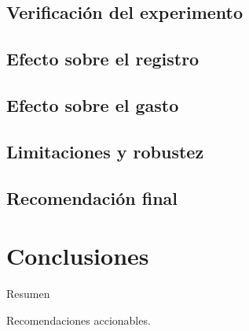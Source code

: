 \documentclass[conference]{IEEEtran}
\begin{document}
\subsection{Verificación del experimento}

\subsection{Efecto sobre el registro}

\subsection{Efecto sobre el gasto}

\subsection{Limitaciones y robustez}

\subsection{Recomendación final}

\section{Conclusiones}

Resumen 

Recomendaciones accionables.
\end{document}
